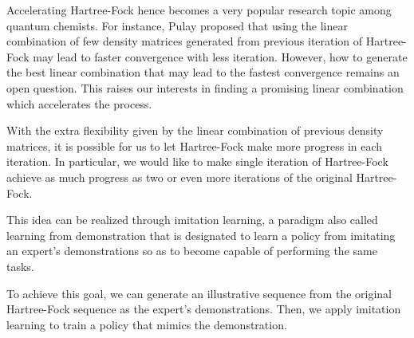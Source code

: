 \documentclass[twoside]{article}
\begin{document}

Accelerating Hartree-Fock hence becomes a very popular research topic among quantum chemists. For instance, Pulay \cite{Pulay1980} proposed that using the linear combination of few density matrices generated from previous iteration of Hartree-Fock may lead to faster convergence with less iteration. However, how to generate the best linear combination that may lead to the fastest convergence remains an open question. This raises our interests in finding a promising linear combination which accelerates the process. %



With the extra flexibility given by the linear combination of previous density matrices, it is possible for us to let Hartree-Fock make more progress in each iteration. 
In particular, we would like to make single iteration of Hartree-Fock achieve as much progress as two or even more iterations of the original Hartree-Fock.




This idea can be realized through imitation learning, a paradigm also called learning from demonstration that is designated to learn a policy from imitating an expert's demonstrations so as to become capable of performing the same tasks. 

To achieve this goal, we can generate an illustrative sequence from the original Hartree-Fock sequence as the expert's demonstrations. Then, we apply imitation learning to train a policy that mimics the demonstration. 
\end{document}
